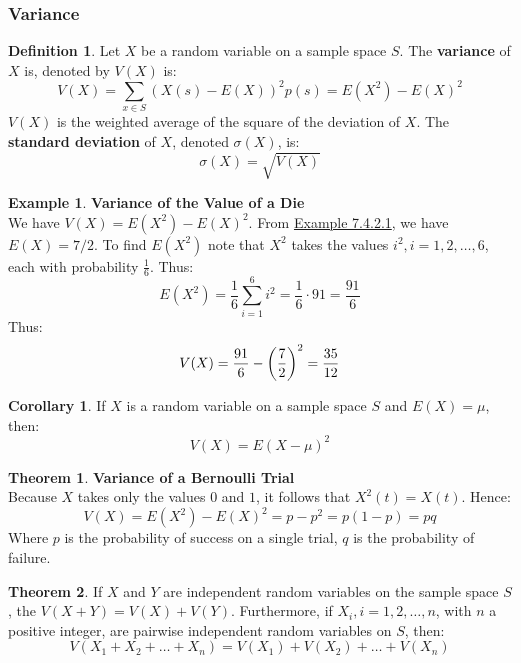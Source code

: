 \documentclass[article, 11pt]{article}
\theoremstyle{definition}
\newtheorem{example}{Example}[subsubsection]
\newtheorem{theorem}{Theorem}[subsubsection]
\newtheorem{definition}{Definition}[subsubsection]
\newtheorem{corollary}{Corollary}[subsubsection]
\DeclarePairedDelimiter\paren{(}{)} %
\begin{document}
    \subsubsection{Variance}
    \begin{definition}
        Let $X$ be a random variable on a sample space $S$. The \textbf{variance} of $X$ is, denoted by $V(X)$ is:
        \begin{equation*}
            V(X) = \sum_{x \in S}(X(s) - E(X))^2p(s)=E(X^2) - E(X)^2
        \end{equation*}
        $V(X)$ is the weighted average of the square of the deviation of $X$. The \textbf{standard deviation} of $X$, denoted $\sigma(X)$, is:
        \begin{equation*}
            \sigma(X) = \sqrt{V(X)}
        \end{equation*}
    \end{definition}
    \begin{example}
        \textbf{Variance of the Value of a Die} \\
        We have $V(X) = E(X^2) - E(X)^2$. From \hyperref[ex:ev-die]{Example 7.4.2.1}, we have $E(X) = 7/2$. To find $E(X^2)$ note that $X^2$ takes the values $i^2, i=1,2,\dots,6$, each with probability $\frac{1}{6}$. Thus:
        \begin{equation*}
            E(X^2) = \frac{1}{6}\sum_{i=1}^6 i^2 = \frac{1}{6}\cdot 91 = \frac{91}{6}
        \end{equation*}
        Thus:
        \begin{equation*}
            V(X) = \frac{91}{6} - \paren*{\frac{7}{2}}^2 = \frac{35}{12}
        \end{equation*}
    \end{example}
    \begin{corollary}
        If $X$ is a random variable on a sample space $S$ and $E(X) = \mu$, then:
        \begin{equation*}
            V(X) = E(X - \mu)^2
        \end{equation*}
    \end{corollary}
    \begin{theorem}
        \textbf{Variance of a Bernoulli Trial} \\
        Because $X$ takes only the values $0$ and $1$, it follows that $X^2(t) = X(t)$. Hence:
        \begin{equation*}
            V(X) = E(X^2) - E(X)^2 = p - p^2 = p(1-p) = pq
        \end{equation*}
        Where $p$ is the probability of success on a single trial, $q$ is the probability of failure.
    \end{theorem}
    \begin{theorem}
        If $X$ and $Y$ are independent random variables on the sample space $S$, the $V(X+Y) = V(X) + V(Y)$. Furthermore, if $X_i, i=1,2,\dots,n$, with $n$ a positive integer, are pairwise independent random variables on $S$, then:
        \begin{equation*}
            V(X_1 + X_2 + \dots + X_n) = V(X_1) + V(X_2) + \dots + V(X_n)
        \end{equation*}
    \end{theorem}
\end{document}
